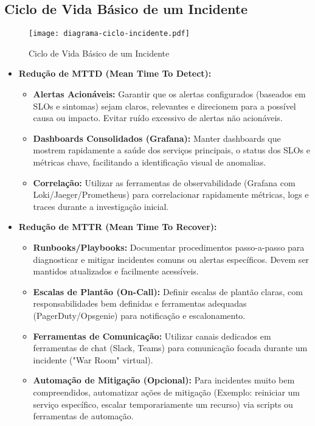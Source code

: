 \subsection{Ciclo de Vida Básico de um Incidente}
\label{subsec:ciclo-incidente}

\begin{figure}[htbp]
    \centering
    \texttt{[image: diagrama-ciclo-incidente.pdf]}
    \caption{Ciclo de Vida Básico de um Incidente}
    \label{fig:ciclo-incidente}
\end{figure}

\begin{itemize}
    \item \textbf{Redução de MTTD (Mean Time To Detect):}
        \begin{itemize}
            \item \textbf{Alertas Acionáveis:} Garantir que os alertas configurados (baseados em SLOs e sintomas) sejam claros, relevantes e direcionem para a possível causa ou impacto. Evitar ruído excessivo de alertas não acionáveis.
            \item \textbf{Dashboards Consolidados (Grafana):} Manter dashboards que mostrem rapidamente a saúde dos serviços principais, o status dos SLOs e métricas chave, facilitando a identificação visual de anomalias.
            \item \textbf{Correlação:} Utilizar as ferramentas de observabilidade (Grafana com Loki/Jaeger/Prometheus) para correlacionar rapidamente métricas, logs e traces durante a investigação inicial.
        \end{itemize}
    \item \textbf{Redução de MTTR (Mean Time To Recover):}
        \begin{itemize}
            \item \textbf{Runbooks/Playbooks:} Documentar procedimentos passo-a-passo para diagnosticar e mitigar incidentes comuns ou alertas específicos. Devem ser mantidos atualizados e facilmente acessíveis.
            \item \textbf{Escalas de Plantão (On-Call):} Definir escalas de plantão claras, com responsabilidades bem definidas e ferramentas adequadas (PagerDuty/Opsgenie) para notificação e escalonamento.
            \item \textbf{Ferramentas de Comunicação:} Utilizar canais dedicados em ferramentas de chat (Slack, Teams) para comunicação focada durante um incidente ("War Room" virtual).
            \item \textbf{Automação de Mitigação (Opcional):} Para incidentes muito bem compreendidos, automatizar ações de mitigação (Exemplo: reiniciar um serviço específico, escalar temporariamente um recurso) via scripts ou ferramentas de automação.

\end{itemize}
\end{itemize}
